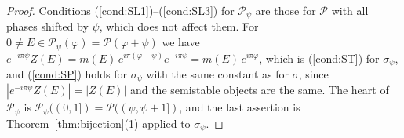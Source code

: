 \documentclass[12pt]{amsart}
\newcommand{\condref}[1]{\textup{(\ref{#1})}}
\numberwithin{theorem}{section}
\theoremstyle{definition}
\newcommand{\calP}{\mathcal{P}}
\begin{document}
	\begin{proof}
		Conditions \condref{cond:SL1}--\condref{cond:SL3} for $\calP_{\psi}$ are those for $\calP$ with all phases shifted by $\psi$, which does not affect them.
		For $0 \neq E \in \calP_{\psi}(\varphi) = \calP(\varphi + \psi)$ we have $e^{-i \pi \psi} Z(E) = m(E) \, e^{i \pi (\varphi + \psi)} e^{-i \pi \psi} = m(E) \, e^{i \pi \varphi}$, which is \condref{cond:ST} for $\sigma_{\psi}$, and \condref{cond:SP} holds for $\sigma_{\psi}$ with the same constant as for $\sigma$, since $|e^{-i \pi \psi} Z(E)| = |Z(E)|$ and the semistable objects are the same.
		The heart of $\calP_{\psi}$ is $\calP_{\psi}((0, 1]) = \calP((\psi, \psi + 1])$, and the last assertion is Theorem~\ref{thm:bijection}(1) applied to $\sigma_{\psi}$.
	\end{proof}
\end{document}
